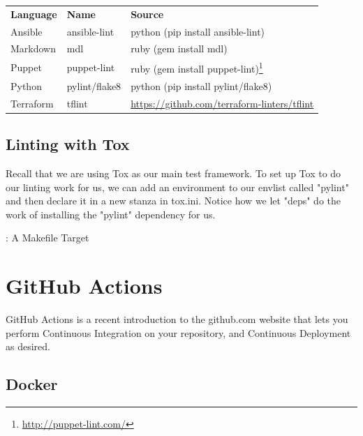 \begin{table}[h]
	\begin{center}
		\begin{tabular}{| p{2.5cm}| p{2.5cm} | p{2.5cm} |}
			\hline
			\textbf{Language} & \textbf{Name} & \textbf{Source}                                                        \\
			Ansible           & ansible-lint  & python (pip install ansible-lint)                                      \\
			Markdown          & mdl           & ruby (gem install mdl)                                                 \\
			Puppet            & puppet-lint   & ruby (gem install puppet-lint)\footnote{\url{http://puppet-lint.com/}} \\
			Python            & pylint/flake8 & python (pip install pylint/flake8)                                     \\
			Terraform         & tflint        & \url{https://github.com/terraform-linters/tflint}
		\end{tabular}
	\end{center}
\end{table}

\subsection{Linting with Tox}

Recall that we are using Tox as our main test framework. To set up Tox
to do our linting work for us, we can add an environment to our envlist
called "pylint" and then declare it in a new stanza in tox.ini. Notice
how we let "deps" do the work of installing the "pylint" dependency for
us.

\begin{mybox}{\thetcbcounter: A Makefile Target}
	
\end{mybox}

\section{GitHub Actions}

\justify
GitHub Actions is a recent introduction to the github.com website that
lets you perform Continuous Integration on your repository, and Continuous Deployment as desired.

\subsection{Docker}

